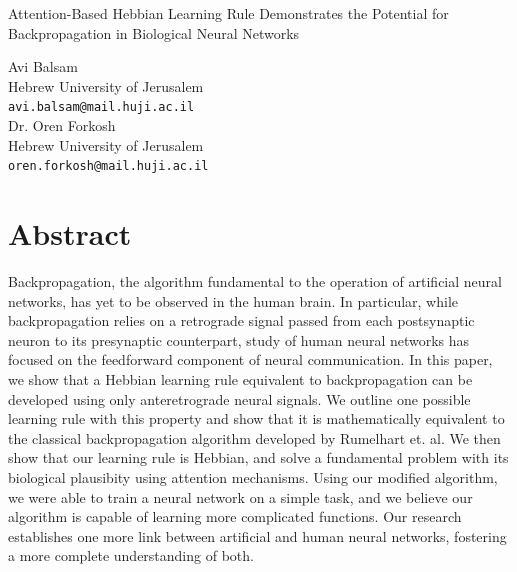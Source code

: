 \documentclass[12pt]{article}
\begin{document}
\begin{center}
\Large
Attention-Based Hebbian Learning Rule Demonstrates the Potential for Backpropagation in Biological Neural Networks
\end{center}

\begin{center}
Avi Balsam \\
Hebrew University of Jerusalem\\
\verb+avi.balsam@mail.huji.ac.il+\\
\vspace{0.2cm}
Dr. Oren Forkosh\\
Hebrew University of Jerusalem\\
\verb+oren.forkosh@mail.huji.ac.il+
\end{center}

\section{Abstract}
Backpropagation, the algorithm fundamental to the operation of artificial neural networks, has yet to be observed in the human brain. In particular, while backpropagation relies on a retrograde signal passed from each postsynaptic neuron to its presynaptic counterpart, study of human neural networks has focused on the feedforward component of neural communication. In this paper, we show that a Hebbian learning rule equivalent to backpropagation can be developed using only anteretrograde neural signals. We outline one possible learning rule with this property and show that it is mathematically equivalent to the classical backpropagation algorithm developed by Rumelhart et. al. We then show that our learning rule is Hebbian, and solve a fundamental problem with its biological plausibity using attention mechanisms. Using our modified algorithm, we were able to train a neural network on a simple task, and we believe our algorithm is capable of learning more complicated functions. Our research establishes one more link between artificial and human neural networks, fostering a more complete understanding of both.
\end{document}
